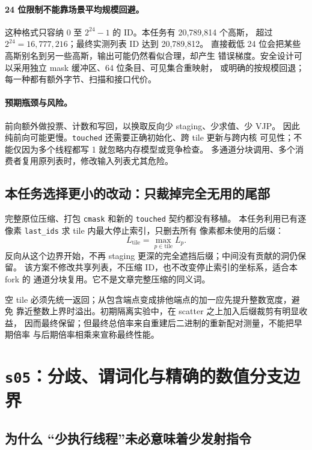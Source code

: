 \paragraph{24 位限制不能靠场景平均规模回避。}
这种格式只容纳 $0$ 至 $2^{24}-1$ 的 ID。本任务有 20,789,814 个高斯，
超过 $2^{24}=16,777,216$；最终实测列表 ID 达到 20,789,812。
直接截低 24 位会把某些高斯别名到另一些高斯，输出可能仍然看似合理，却产生
错误梯度。安全设计可以采用独立 mask 缓冲区、64 位条目、可见集合重映射，
或明确的按规模回退；每一种都有额外字节、扫描和接口代价。

\paragraph{预期瓶颈与风险。}
前向额外做投票、计数和写回，以换取反向少 staging、少求值、少 VJP。
因此纯前向可能更慢。\texttt{touched} 还需要正确初始化、跨 tile 更新与跨内核
可见性；不能仅因为多个线程都写 1 就忽略内存模型或竞争检查。
多通道分块调用、多个消费者复用原列表时，修改输入列表尤其危险。

\subsection{本任务选择更小的改动：只裁掉完全无用的尾部}

完整原位压缩、打包 \texttt{cmask} 和新的 \texttt{touched} 契约都没有移植。
本任务利用已有逐像素 \texttt{last\_ids} 求 tile 内最大停止索引，只删去所有
像素都未使用的后缀：
\begin{equation}
 L_{\mathrm{tile}}=\max_{p\in\mathrm{tile}}L_p.
\end{equation}
反向从这个边界开始，不再 staging 更深的完全遮挡后缀；中间没有贡献的洞仍保留。
该方案不修改共享列表，不压缩 ID，也不改变停止索引的坐标系，适合本 fork 的
通道分块复用。它不是文章完整压缩的同义词。

空 tile 必须先统一返回；从包含端点变成排他端点的加一应先提升整数宽度，避免
靠近整数上界时溢出。初期隔离实验中，在 scatter 之上加入后缀裁剪有明显收益，
因而最终保留；但最终总倍率来自重建后二进制的重新配对测量，不能把早期倍率
与后期倍率相乘来宣称最终性能。

\section{\texttt{s05}：分歧、谓词化与精确的数值分支边界}

\subsection{为什么 ``少执行线程''未必意味着少发射指令}

